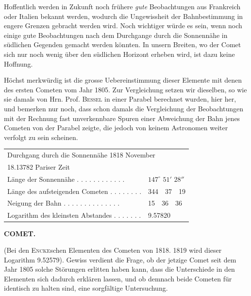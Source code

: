 \par\indent Hoffentlich werden in Zukunft noch frühere \emph{gute} Beobachtungen aus Frankreich
oder Italien bekannt werden, wodurch die Ungewissheit der Bahnbestimmung in engere
Grenzen gebracht werden wird. Noch wichtiger würde es sein, wenn noch einige gute
Beobachtungen nach dem Durchgange durch die Sonnennähe in südlichen Gegenden gemacht
werden könnten. In unsern Breiten, wo der Comet sich nur noch wenig über den südlichen
Horizont erheben wird, ist dazu keine Hoffnung.

\par\indent Höchst merkwürdig ist die grosse Uebereinstimmung dieser Elemente mit denen des ersten
Cometen vom Jahr 1805. Zur Vergleichung setzen wir dieselben, so wie sie damals von Hrn.
Prof. \textsc{Bessel} in einer Parabel berechnet wurden, hier her, und bemerken nur noch, dass
schon damals die Vergleichung der Beobachtungen mit der Rechnung fast unverkennbare
Spuren einer Abweichung der Bahn jenes Cometen von der Parabel zeigte, die jedoch von
keinem Astronomen weiter verfolgt zu sein scheinen.

\begin{center}
\begin{tabular}{l l}
\multicolumn{2}{l}{Durchgang durch die Sonnennähe 1818 November} \\
\multicolumn{2}{l}{18.13782 Pariser Zeit} \\
Länge der Sonnennähe . . . . . . . . . . . . & $147^\circ$ $51'$ $28''$ \\
Länge des aufsteigenden Cometen . . . . . . . . & 344\ \ 37\ \ 19 \\
Neigung der Bahn . . . . . . . . . . . . . . & 15\ \ 36\ \ 36 \\
Logarithm des kleinsten Abstandes . . . . . . . & 9.57820 \\
\end{tabular}
\end{center}

\clearpage
\thispagestyle{empty}
\noindent{}%
\makebox[12mm][l]{}%
\parbox[t]{\dimexpr\linewidth-24mm\relax}{\centering\footnotesize\bfseries COMET.\par}%
\par\nobreak\medskip
\noindent (Bei den \textsc{Encke}schen Elementen des Cometen von 1818. 1819 wird dieser Logarithm
9.52579). Gewiss verdient die Frage, ob der jetzige Comet seit dem Jahr 1805 solche
Störungen erlitten haben kann, dass die Unterschiede in den Elementen sich dadurch
erklären lassen, und ob demnach beide Cometen für identisch zu halten sind, eine
sorgfältige Untersuchung.

